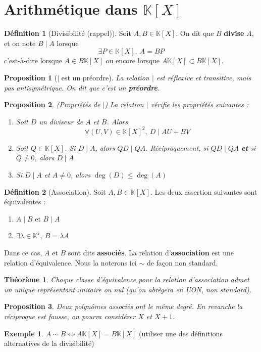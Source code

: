 \documentclass[french]{book}
\newcommand{\K}{\mathbb{K}}
\newcommand{\st}{^\star}
\theoremstyle{plain}
\newtheorem{thm}{Théorème}[chapter]
\newtheorem{prop}{Proposition}[chapter]
\theoremstyle{definition}
\newtheorem{dfn}{Définition}[chapter]
\newtheorem{exa}{Exemple}[chapter]
\theoremstyle{remark}
\begin{document}
\section{Arithmétique dans $\K[X]$}
\begin{dfn}[Divisibilité (rappel)]
	Soit $A,B\in\K[X]$. On dit que $B$ \textbf{divise} $A$, et on note $B\mid A$ lorsque $$\exists P\in\K[X],\ A=BP$$ c'est-à-dire lorsque $A\in B\K[X]$ ou encore lorsque $A\K[X]\subset B\K[X]$.
\end{dfn}
\begin{prop}[$\mid$ est un préordre]
	La relation $\mid$ est réflexive et transitive, mais pas antisymétrique. On dit que c'est un \textbf{préordre}.
\end{prop}
\begin{prop}(Propriétés de $\mid$)
	La relation $\mid$ vérifie les propriétés suivantes : 
	\begin{enumerate}
		\item Soit $D$ un diviseur de $A$ et $B$. Alors $$\forall(U,V)\in\K[X]^2,\ D\mid AU+BV$$
		\item Soit $Q\in\K[X]$. Si $D\mid A$, alors $QD\mid QA$. Réciproquement, si $QD\mid QA$ \textbf{et} si $Q\ne 0$, alors $D\mid A$.
		\item Si $D\mid A$ et $A\ne 0$, alors $\deg(D)\leqslant\deg(A)$
	\end{enumerate}
\end{prop}
\begin{dfn}[Association]
	Soit $A,B\in\K[X]$. Les deux assertion suivantes sont équivalentes :
	\begin{enumerate}
		\item $A\mid B$ et $B\mid A$
		\item $\exists\lambda\in\K\st,\ B=\lambda A$
	\end{enumerate}
	Dans ce cas, $A$ et $B$ sont dits \textbf{associés}. La relation d'\textbf{association} est une relation d'équivalence. Nous la noterons ici $\sim$ de façon non standard.
\end{dfn}
\begin{thm}
	Chaque classe d'équivalence pour la relation d'association admet un unique représentant unitaire ou nul (qu'on abrègera en UON, non standard).
\end{thm}
\begin{prop}
	Deux polynômes associés ont le même degré. En revanche la réciproque est fausse, on pourra considérer $X$ et $X+1$.
\end{prop}
\begin{exa}
	$A\sim B \iff A\K[X]=B\K[X]$ (utiliser une des définitions alternatives de la divisibilité)
\end{exa}
\end{document}

